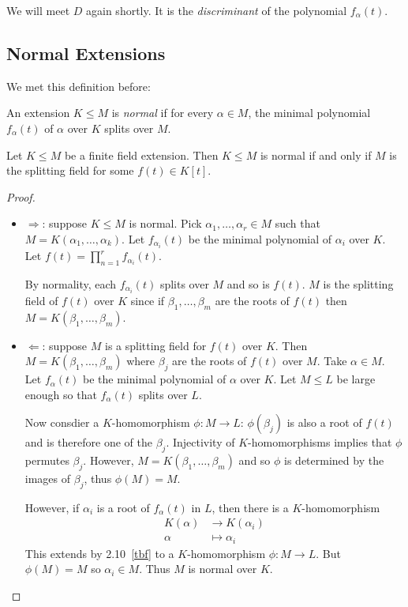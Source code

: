 \documentclass[a4paper]{article}
\begin{document}
\begin{remark}
  We will meet \(D\) again shortly. It is the \emph{discriminant} of the polynomial \(f_\alpha(t)\).
\end{remark}

\subsection{Normal Extensions}

We met this definition before:

\begin{definition}
  An extension \(K \leq M\) is \emph{normal} if for every \(\alpha \in M\), the minimal polynomial \(f_\alpha(t)\) of \(\alpha\) over \(K\) splits over \(M\).
\end{definition}

\begin{theorem}
  Let \(K \leq M\) be a finite field extension. Then \(K \leq M\) is normal if and only if \(M\) is the splitting field for some \(f(t) \in K[t]\).
\end{theorem}

\begin{proof}\leavevmode
  \begin{itemize}
  \item \(\Rightarrow\): suppose \(K \leq M\) is normal. Pick \(\alpha_1, \dots, \alpha_r \in M\) such that \(M = K(\alpha_1, \dots, \alpha_k)\). Let \(f_{\alpha_i}(t)\) be the minimal polynomial of \(\alpha_i\) over \(K\). Let \(f(t) = \prod_{n = 1}^{r} f_{\alpha_i}(t)\).

    By normality, each \(f_{\alpha_i}(t)\) splits over \(M\) and so is \(f(t)\). \(M\) is the splitting field of \(f(t)\) over \(K\) since if \(\beta_1, \dots, \beta_m\) are the roots of \(f(t)\) then \(M = K(\beta_1, \dots, \beta_m)\).
  \item \(\Leftarrow\): suppose \(M\) is a splitting field for \(f(t)\) over \(K\). Then \(M = K(\beta_1, \dots, \beta_m)\) where \(\beta_j\) are the roots of \(f(t)\) over \(M\). Take \(\alpha \in M\). Let \(f_\alpha(t)\) be the minimal polynomial of \(\alpha\) over \(K\). Let \(M \leq L\) be large enough so that \(f_\alpha(t)\) splits over \(L\).

    Now consdier a \(K\)-homomorphism \(\phi: M \to L\): \(\phi(\beta_j)\) is also a root of \(f(t)\) and is therefore one of the \(\beta_j\). Injectivity of \(K\)-homomorphisms implies that \(\phi\) permutes \(\beta_j\). However, \(M = K(\beta_1, \dots, \beta_m)\) and so \(\phi\) is determined by the images of \(\beta_j\), thus \(\phi(M) = M\).

    However, if \(\alpha_i\) is a root of \(f_\alpha(t)\) in \(L\), then there is a \(K\)-homomorphism
    \begin{align*}
      K(\alpha) &\to K(\alpha_i) \\
      \alpha &\mapsto \alpha_i
    \end{align*}
    This extends by 2.10~\ref{tbf} to a \(K\)-homomorphism \(\phi: M \to L\). But \(\phi(M) = M\) so \(\alpha_i \in M\). Thus \(M\) is normal over \(K\).
  \end{itemize}
\end{proof}
\end{document}
